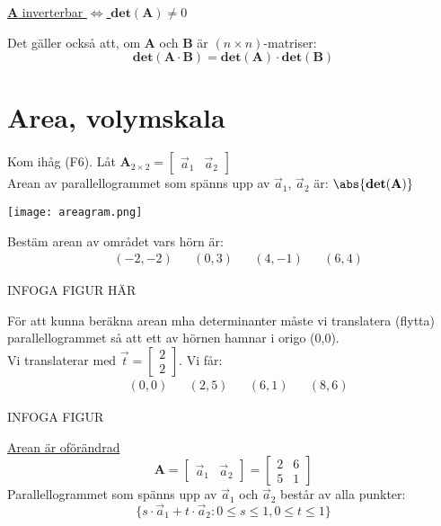 \begin{center}
	\underline{\textbf{A} inverterbar $\Leftrightarrow$ $\mathbf{det}(\mathbf{A}) \neq 0$}
\end{center}
\newpage
\begin{sats}
	Det gäller också att, om \textbf{A} och \textbf{B} är $(n \times n)$-matriser:
	\[
	\mathbf{det}(\mathbf{A} \cdot \mathbf{B}) = \mathbf{det}(\mathbf{A}) \cdot \mathbf{det}(\mathbf{B})
	\]
\end{sats}
\section{Area, volymskala} %
\label{sec:area_volymskala}
Kom ihåg (F6). Låt $\mathbf{A}_{2 \times 2} = \begin{bmatrix} \vec{a}_1 & \vec{a}_2 \end{bmatrix}$\\
Arean av parallellogrammet som spänns upp av $\vec{a}_1$, $\vec{a}_2$ är: $\abs{\mathbf{det}(\mathbf{A})}$
\begin{center}
	\texttt{[image: areagram.png]}
\end{center}
\begin{Ex}
	Bestäm arean av området vars hörn är:
	\begin{align*}
	&(-2,-2)
	&&(0,3)
	&&(4,-1)
	&&(6,4)
	\end{align*}
	\begin{center}
		INFOGA FIGUR HÄR
	\end{center}
	För att kunna beräkna arean mha determinanter måste vi translatera (flytta) parallellogrammet så att ett av hörnen hamnar i origo (0,0).\\
	Vi translaterar med $\vec{t} = \begin{bmatrix} 2\\2 \end{bmatrix}$. Vi får:
	\begin{align*}
	&(0,0)
	&&(2,5)
	&&(6,1)
	&&(8,6)
	\end{align*}
	\begin{center}
		INFOGA FIGUR
	\end{center}
	\underline{Arean är oförändrad}
	\[
	\mathbf{A} = \begin{bmatrix} \vec{a}_1&\vec{a}_2 \end{bmatrix} = \begin{bmatrix} 2&6\\5&1 \end{bmatrix}
	\]
	Parallellogrammet som spänns upp av $\vec{a}_1$ och $\vec{a}_2$ består av alla punkter:
	\[
	\{s \cdot \vec{a}_1 + t \cdot \vec{a}_2: 0 \le s \le 1, 0 \le t \le 1\}
	\]
\end{Ex}
